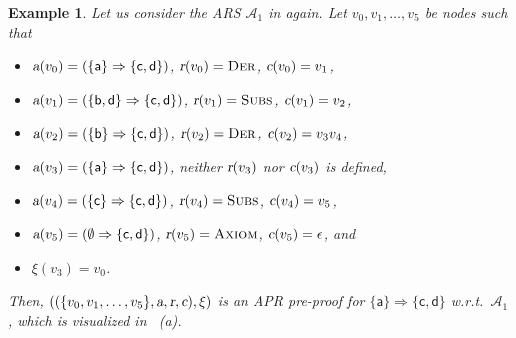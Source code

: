 \documentclass[10pt,a4paper]{article}
\newtheorem{example}[theorem]{Example}
\def\cA{\mathcal{A}}
\newcommand{\symb}[1]{\mathsf{#1}}
\newcommand{\ReachPred}[2]{#1 \Rightarrow #2}
\newcommand{\RuleName}[1]{{\rm \textsc{#1}}}
\newcommand{\varsl}[1]{\mbox{\sl #1}}
\def\cAabcd{\cA_1}
\begin{document}
\begin{example}
	\label{ex:APR-pre-proof-of-cAabcd}
	Let us consider the ARS $\cAabcd$ in  again.
	Let $v_0,v_1,\ldots,v_5$ be nodes such that
	\begin{itemize}
		\item $\varsl{a}(v_0) = (\ReachPred{\{\symb{a}\}}{\{\symb{c},\symb{d}\}})$, $\varsl{r}(v_0)=\mbox{\rm\RuleName{Der}}$, $\varsl{c}(v_0) = v_1$,
		\item $\varsl{a}(v_1) = (\ReachPred{\{\symb{b},\symb{d}\}}{\{\symb{c},\symb{d}\}})$, $\varsl{r}(v_1)=\mbox{\rm\RuleName{Subs}}$, $\varsl{c}(v_1) = v_2$,
		\item $\varsl{a}(v_2) = (\ReachPred{\{\symb{b}\}}{\{\symb{c},\symb{d}\}})$, $\varsl{r}(v_2)=\mbox{\rm\RuleName{Der}}$, $\varsl{c}(v_2) = v_3v_4$,
		\item $\varsl{a}(v_3) = (\ReachPred{\{\symb{a}\}}{\{\symb{c},\symb{d}\}})$, neither $\varsl{r}(v_3)$ nor $\varsl{c}(v_3)$ is defined,
		\item $\varsl{a}(v_4) = (\ReachPred{\{\symb{c}\}}{\{\symb{c},\symb{d}\}})$, $\varsl{r}(v_4)=\mbox{\rm\RuleName{Subs}}$, $\varsl{c}(v_4) = v_5$,
		\item $\varsl{a}(v_5) = (\ReachPred{\emptyset}{\{\symb{c},\symb{d}\}})$, $\varsl{r}(v_5)=\mbox{\rm\RuleName{Axiom}}$, $\varsl{c}(v_5) = \epsilon$,
		      and
		\item $\xi(v_3) = v_0$.
	\end{itemize}
	Then, $((\{v_0,v_1,\ldots,v_5\},\varsl{a},\varsl{r},\varsl{c}),\xi)$ is an APR pre-proof for $\ReachPred{\{\symb{a}\}}{\{\symb{c},\symb{d}\}}$ w.r.t.\ $\cAabcd$,
	which is visualized in ~(a).
\end{example}
\end{document}
